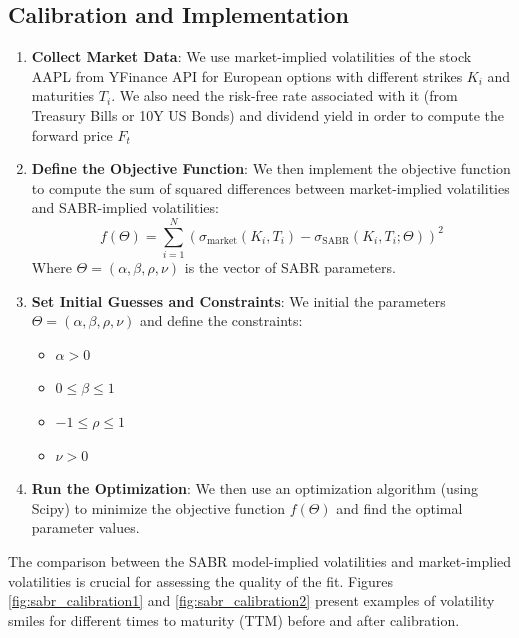 \documentclass[11pt, oneside, a4paper, titlepage]{report}
\begin{document}
\subsection{Calibration and Implementation}
\begin{enumerate}
    \item \textbf{Collect Market Data}:
    We use market-implied volatilities of the stock AAPL from YFinance API for European options with different strikes \( K_i \) and maturities \( T_i \). We also need the risk-free rate associated with it (from Treasury Bills or 10Y US Bonds) and dividend yield in order to compute the forward price $F_t$
    \item \textbf{Define the Objective Function}:
    We then implement the objective function to compute the sum of squared differences between market-implied volatilities and SABR-implied volatilities:
    \[
    f(\Theta) = \sum_{i=1}^N \left( \sigma_{\text{market}}(K_i, T_i) - \sigma_{\text{SABR}}(K_i, T_i; \Theta) \right)^2
    \]
    Where \( \Theta = (\alpha, \beta, \rho, \nu) \) is the vector of SABR parameters.
    \item \textbf{Set Initial Guesses and Constraints}:
    We initial the parameters \( \Theta = (\alpha, \beta, \rho, \nu) \) and define the constraints:
    \begin{itemize}
        \item \( \alpha > 0 \)
        \item \( 0 \leq \beta \leq 1 \)
        \item \( -1 \leq \rho \leq 1 \)
        \item \( \nu > 0 \)
    \end{itemize}
    \item \textbf{Run the Optimization}:
    We then use an optimization algorithm (using Scipy) to minimize the objective function \( f(\Theta) \) and find the optimal parameter values.
    \end{enumerate}

The comparison between the SABR model-implied volatilities and market-implied volatilities is crucial for assessing the quality of the fit. Figures \ref{fig:sabr_calibration1} and \ref{fig:sabr_calibration2} present examples of volatility smiles for different times to maturity (TTM) before and after calibration. 

\newpage
\end{document}
